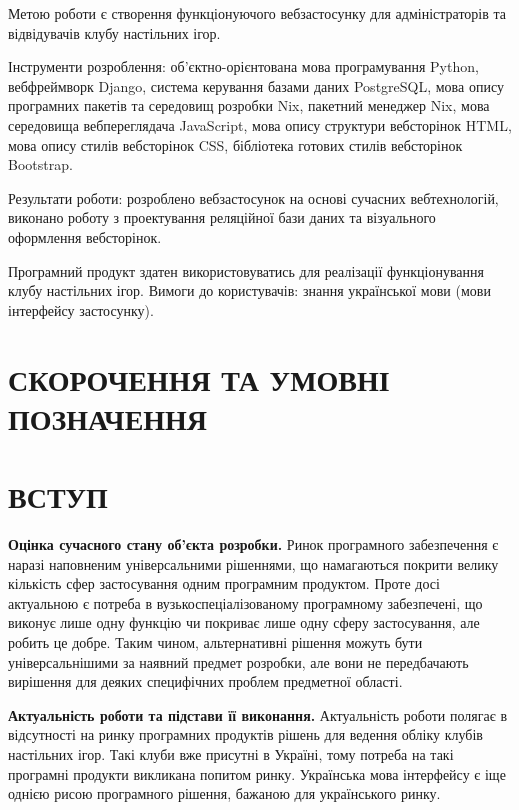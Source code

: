 \documentclass[a4paper, 14pt]{extarticle}
\begin{document}
  Метою роботи є створення функціонуючого вебзастосунку для адміністраторів та
  відвідувачів клубу настільних ігор.

  Інструменти розроблення: об'єктно-орієнтована мова програмування Python,
  вебфреймворк Django, система керування базами даних PostgreSQL, мова опису програмних
  пакетів та середовищ розробки Nix, пакетний менеджер Nix,
  мова середовища вебпереглядача JavaScript, мова
  опису структури вебсторінок HTML, мова опису стилів вебсторінок CSS, бібліотека
  готових стилів вебсторінок Bootstrap.

  Результати роботи: розроблено вебзастосунок на основі сучасних вебтехнологій,
  виконано роботу з проектування реляційної бази даних та візуального оформлення
  вебсторінок.

  Програмний продукт здатен використовуватись для реалізації функціонування
  клубу настільних ігор. Вимоги до користувачів: знання української мови (мови
  інтерфейсу застосунку).

  \clearpage
  \tableofcontents\thispagestyle{myheadings}

  \clearpage
  \section{СКОРОЧЕННЯ ТА УМОВНІ ПОЗНАЧЕННЯ}

  \clearpage
  \section{ВСТУП}

  \textbf{Оцінка сучасного стану об'єкта розробки.}
  Ринок програмного забезпечення є наразі наповненим універсальними рішеннями,
  що намагаються покрити велику кількість сфер застосування одним програмним
  продуктом. Проте досі актуальною є потреба в вузькоспеціалізованому програмному
  забезпечені, що виконує лише одну функцію чи покриває лише одну сферу застосування,
  але робить це добре. Таким чином, альтернативні рішення можуть бути універсальнішими
  за наявний предмет розробки, але вони не передбачають вирішення
  для деяких специфічних проблем предметної області.

  \textbf{Актуальність роботи та підстави її виконання.}
  Актуальність роботи полягає в відсутності на ринку програмних продуктів рішень
  для ведення обліку клубів настільних ігор. Такі клуби вже присутні в Україні,
  тому потреба на такі програмні продукти викликана попитом ринку. Українська мова
  інтерфейсу є іще однією рисою програмного рішення, бажаною для українського ринку.
\end{document}
